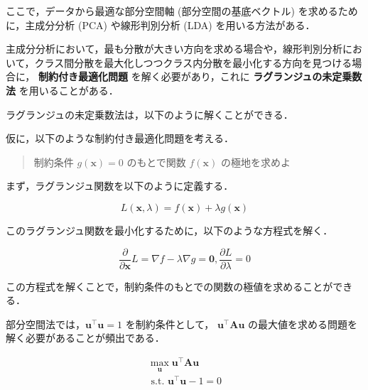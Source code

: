 \documentclass[fleqn, a4paper. 12pt]{jsarticle}
\begin{document}
        ここで，データから最適な部分空間軸 (部分空間の基底ベクトル) を求めるために，主成分分析 (PCA) や線形判別分析 (LDA) を用いる方法がある．
        
        主成分分析において，最も分散が大きい方向を求める場合や，線形判別分析において，クラス間分散を最大化しつつクラス内分散を最小化する方向を見つける場合に，
        \textbf{制約付き最適化問題} を解く必要があり，これに \textbf{ラグランジュの未定乗数法} を用いることがある．

        \quad

        ラグランジュの未定乗数法は，以下のように解くことができる．

        仮に，以下のような制約付き最適化問題を考える．

        \begin{quote}
            制約条件
            $g(\boldsymbol{x})=0$
            のもとで関数
            $f(\boldsymbol{x})$ 
            の極地を求めよ
        \end{quote}

        \quad

        まず，ラグランジュ関数を以下のように定義する．

        \begin{equation}
            L(\boldsymbol{x}, \lambda)=f(\boldsymbol{x})+\lambda g(\boldsymbol{x})
        \end{equation}

        このラグランジュ関数を最小化するために，以下のような方程式を解く．

        \begin{equation}
            \frac{\partial}{\partial \boldsymbol{x}} L=\nabla f-\lambda \nabla g=\mathbf{0}, \frac{\partial L}{\partial \lambda}=0
        \end{equation}

        この方程式を解くことで，制約条件のもとでの関数の極値を求めることができる．

        \quad

        部分空間法では，$\boldsymbol{u}^{\top} \boldsymbol{u}=1$ を制約条件として，
        $\boldsymbol{u}^{\top} \mathbf{A} \boldsymbol{u}$ の最大値を求める問題を解く必要があることが頻出である．

        \begin{equation}
            \begin{gathered}
            \max _{\boldsymbol{u}} \boldsymbol{u}^{\top} \mathbf{A} \boldsymbol{u} \\
            \text { s.t. } \boldsymbol{u}^{\top} \boldsymbol{u}-1=0
            \end{gathered}
        \end{equation}
\end{document}
